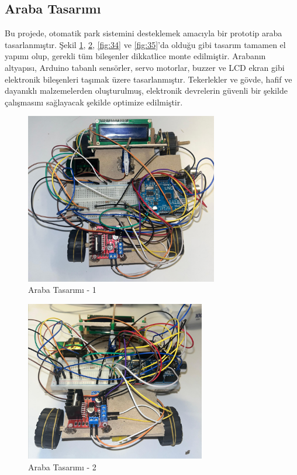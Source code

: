 \subsection{Araba Tasarımı}
    Bu projede, otomatik park sistemini desteklemek amacıyla bir prototip araba tasarlanmıştır. Şekil \ref{fig:32}, \ref{fig:33},  \ref{fig:34} ve \ref{fig:35}'da olduğu gibi tasarım tamamen el yapımı olup, gerekli tüm bileşenler dikkatlice monte edilmiştir. Arabanın altyapısı, Arduino tabanlı sensörler, servo motorlar, buzzer ve LCD ekran gibi elektronik bileşenleri taşımak üzere tasarlanmıştır. Tekerlekler ve gövde, hafif ve dayanıklı malzemelerden oluşturulmuş, elektronik devrelerin güvenli bir şekilde çalışmasını sağlayacak şekilde optimize edilmiştir.

\begin{figure}[H]
\centering
\includegraphics[width=0.75\textwidth]{Resimler/32.png}
\caption{Araba Tasarımı - 1 }
\label{fig:32}
\end{figure}

\begin{figure}[H]
\centering
\includegraphics[width=0.70\textwidth]{Resimler/33.png}
\caption{Araba Tasarımı - 2 }
\label{fig:33}
\end{figure}

